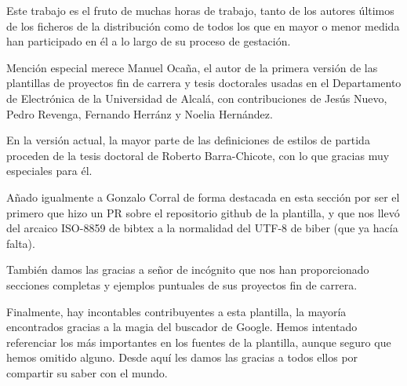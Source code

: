Este trabajo es el fruto de muchas horas de trabajo, tanto de los
autores últimos de los ficheros de la distribución como de todos los que
en mayor o menor medida han participado en él a lo largo de su proceso
de gestación.

Mención especial merece Manuel Ocaña, el autor de la primera versión de
las plantillas de proyectos fin de carrera y tesis doctorales usadas en
el Departamento de Electrónica de la Universidad de Alcalá, con
contribuciones de Jesús Nuevo, Pedro Revenga, Fernando Herránz y Noelia
Hernández.

En la versión actual, la mayor parte de las definiciones de estilos de
partida proceden de la tesis doctoral de Roberto Barra-Chicote, con lo
que gracias muy especiales para él.

Añado igualmente a Gonzalo Corral de forma destacada en esta sección por ser el
primero que hizo un PR sobre el repositorio github de la plantilla, y que nos
llevó del arcaico ISO-8859 de bibtex a la normalidad del UTF-8 de biber (que ya
hacía falta).

También damos las gracias a señor de incógnito que nos
han proporcionado secciones completas y ejemplos puntuales de sus
proyectos fin de carrera.

Finalmente, hay incontables contribuyentes a esta plantilla, la mayoría
encontrados gracias a la magia del buscador de Google. Hemos intentado
referenciar los más importantes en los fuentes de la plantilla, aunque
seguro que hemos omitido alguno. Desde aquí les damos las gracias a
todos ellos por compartir su saber con el mundo.






